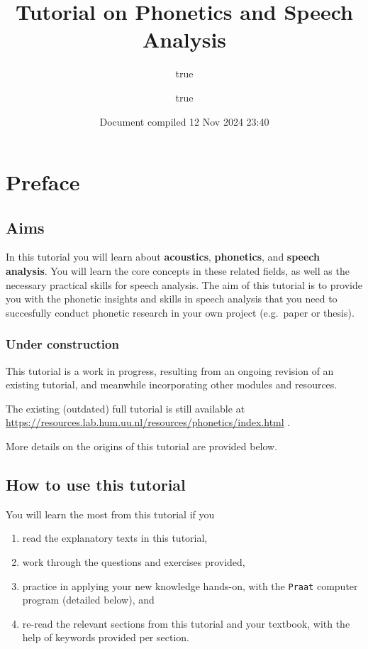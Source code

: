 \documentclass[
]{book}
\title{Tutorial on Phonetics and Speech Analysis}
\author{true \and true}
\date{Document compiled 12 Nov 2024 23:40}
\providecommand{\tightlist}{%
  \setlength{\itemsep}{0pt}\setlength{\parskip}{0pt}}
\begin{document}
\maketitle

{
\setcounter{tocdepth}{1}
\tableofcontents
}
\chapter*{Preface}\label{preface}

\section*{Aims}\label{aims}

In this tutorial you will learn about \textbf{acoustics}, \textbf{phonetics}, and \textbf{speech analysis}.
You will learn the core concepts in these related fields, as well as the necessary practical skills for speech analysis.
The aim of this tutorial is to provide you with the phonetic insights and skills in speech analysis that you need to succesfully conduct phonetic research in your own project (e.g.~paper or thesis).

\subsection*{Under construction}\label{under-construction}

This tutorial is a work in progress, resulting from an ongoing revision of an existing tutorial, and meanwhile incorporating other modules and resources.

The existing (outdated) full tutorial is still available at \url{https://resources.lab.hum.uu.nl/resources/phonetics/index.html}
.

More details on the origins of this tutorial are provided below.

\section*{How to use this tutorial}\label{how-to-use-this-tutorial}

You will learn the most from this tutorial if you

\begin{enumerate}
\def\labelenumi{(\arabic{enumi})}
\tightlist
\item
  read the explanatory texts in this tutorial,
\item
  work through the questions and exercises provided,
\item
  practice in applying your new knowledge hands-on, with the \texttt{Praat} computer program (detailed below), and
\item
  re-read the relevant sections from this tutorial and your textbook, with the help of keywords provided per section.
\end{enumerate}
\end{document}
